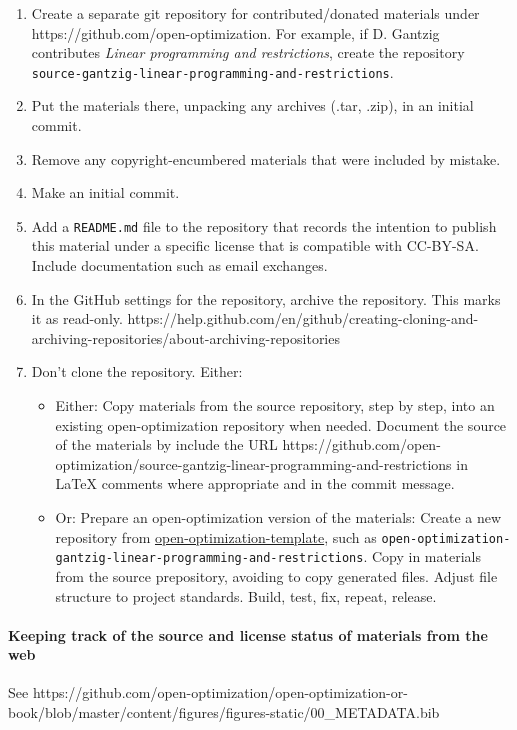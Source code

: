 \begin{enumerate}
\def\labelenumi{\arabic{enumi}.}
\item
  Create a separate git repository for contributed/donated materials
  under https://github.com/open-optimization. For example, if D. Gantzig
  contributes \emph{Linear programming and restrictions}, create the
  repository
  \texttt{source-gantzig-linear-programming-and-restrictions}.
\item
  Put the materials there, unpacking any archives (.tar, .zip), in an
  initial commit.
\item
  Remove any copyright-encumbered materials that were included by
  mistake.
\item
  Make an initial commit.
\item
  Add a \texttt{README.md} file to the repository that records the
  intention to publish this material under a specific license that is
  compatible with CC-BY-SA. Include documentation such as email
  exchanges.
\item
  In the GitHub settings for the repository, archive the repository.
  This marks it as read-only.
  https://help.github.com/en/github/creating-cloning-and-archiving-repositories/about-archiving-repositories
\item
  Don't clone the repository. Either:

  \begin{itemize}
  \item
    Either: Copy materials from the source repository, step by step,
    into an existing open-optimization repository when needed. Document
    the source of the materials by include the URL
    https://github.com/open-optimization/source-gantzig-linear-programming-and-restrictions
    in LaTeX comments where appropriate and in the commit message.
  \item
    Or: Prepare an open-optimization version of the materials: Create a
    new repository from
    \href{https://github.com/open-optimization/open-optimization-template}{open-optimization-template},
    such as
    \texttt{open-optimization-gantzig-linear-programming-and-restrictions}.
    Copy in materials from the source prepository, avoiding to copy
    generated files. Adjust file structure to project standards. Build,
    test, fix, repeat, release.
  \end{itemize}
\end{enumerate}

\hypertarget{keeping-track-of-the-source-and-license-status-of-materials-from-the-web}{%
\paragraph{Keeping track of the source and license status of materials
from the
web}\label{keeping-track-of-the-source-and-license-status-of-materials-from-the-web}}

See
https://github.com/open-optimization/open-optimization-or-book/blob/master/content/figures/figures-static/00\_METADATA.bib
